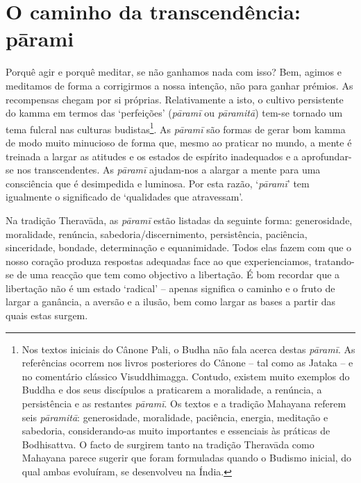 \section{O caminho da transcendência: pārami}

Porquê agir e porquê meditar, se não ganhamos nada com isso? Bem, agimos e meditamos de forma a corrigirmos a nossa intenção, não para ganhar prémios. As recompensas chegam por si próprias. Relativamente a isto, o cultivo persistente do kamma em termos das `perfeições' (\emph{pāramī} ou \emph{pāramitā}) tem-se tornado um tema fulcral nas culturas budistas\footnote{Nos textos iniciais do Cânone Pali, o Budha não fala acerca destas \emph{pāramī}. As referências ocorrem nos livros posteriores do Cânone -- tal como as Jataka -- e no comentário clássico Visuddhimagga. Contudo, existem muito exemplos do Buddha e dos seus discípulos a praticarem a moralidade, a renúncia, a persistência e as restantes \emph{pāramī}. Os textos e a tradição Mahayana referem seis \emph{pāramitā}: generosidade, moralidade, paciência, energia, meditação e sabedoria, considerando-as muito importantes e essenciais às práticas de Bodhisattva. O facto de surgirem tanto na tradição Theravāda como Mahayana parece sugerir que foram formuladas quando o Budismo inicial, do qual ambas evoluíram, se desenvolveu na Índia.}. As \emph{pāramī} são formas de gerar bom kamma de modo muito minucioso de forma que, mesmo ao praticar no mundo, a mente é treinada a largar as atitudes e os estados de espírito inadequados e a aprofundar-se nos transcendentes. As \emph{pāramī} ajudam-nos a alargar a mente para uma consciência que é desimpedida e luminosa. Por esta razão, `\emph{pāramī}' tem igualmente o significado de `qualidades que atravessam'.

Na tradição Theravāda, as \emph{pāramī} estão listadas da seguinte forma: generosidade, moralidade, renúncia, sabedoria/discernimento, persistência, paciência, sinceridade, bondade, determinação e equanimidade. Todos elas fazem com que o nosso coração produza respostas adequadas face ao que experienciamos, tratando-se de uma reacção que tem como objectivo a libertação. É bom recordar que a libertação não é um estado `radical' -- apenas significa o caminho e o fruto de largar a ganância, a aversão e a ilusão, bem como largar as bases a partir das quais estas surgem.

